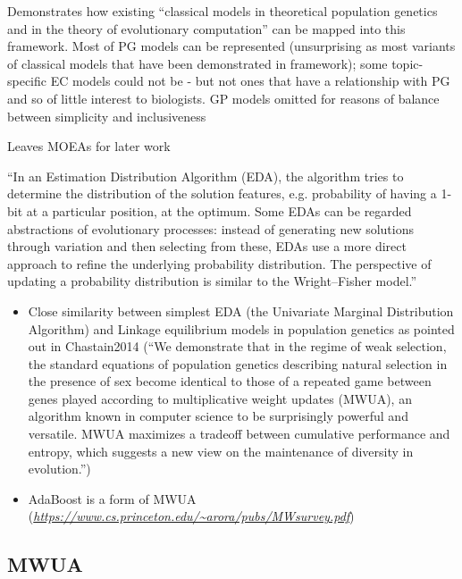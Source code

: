 	Demonstrates how existing ``classical models in theoretical population
	genetics and in the theory of evolutionary computation'' can be mapped
	into this framework. Most of PG models can be represented
	(unsurprising as most variants of classical models that have been
	demonstrated in framework); some topic-specific EC models could not be
	- but not ones that have a relationship with PG and so of little
	interest to biologists. GP models omitted for reasons of balance
	between simplicity and inclusiveness
	
	Leaves MOEAs for later work

	``In an Estimation Distribution Algorithm (EDA), the algorithm tries
	to determine the distribution of the solution features, e.g.
	probability of having a 1-bit at a particular position, at the
	optimum. Some EDAs can be regarded abstractions of evolutionary
	processes: instead of generating new solutions through variation and
	then selecting from these, EDAs use a more direct approach to refine
	the underlying probability distribution. The perspective of updating a
	probability distribution is similar to the Wright--Fisher model.''
		
	\begin{itemize}
		\item
		
		Close similarity between simplest EDA (the Univariate Marginal
		Distribution Algorithm) and Linkage equilibrium models in population
		genetics as pointed out in Chastain2014 (``We demonstrate that in
		the regime of weak selection, the standard equations of population
		genetics describing natural selection in the presence of sex become
		identical to those of a repeated game between genes played according
		to multiplicative weight updates (MWUA), an algorithm known in
		computer science to be surprisingly powerful and versatile. MWUA
		maximizes a tradeoff between cumulative performance and entropy,
		which suggests a new view on the maintenance of diversity in
		evolution.'')
		
		\item
		
		AdaBoost is a form of MWUA
		(\href{https://www.cs.princeton.edu/~arora/pubs/MWsurvey.pdf}{\emph{https://www.cs.princeton.edu/\textasciitilde{}arora/pubs/MWsurvey.pdf}})
		
	\end{itemize}

\subsection{MWUA}

